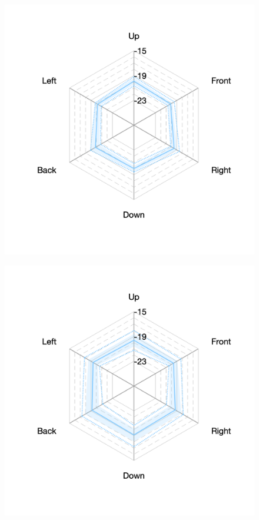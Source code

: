 \documentclass[11pt,a4j]{jreport}
\begin{document}
\begin{figure}[H]
      \begin{minipage}[b]{.33\textwidth}
        \centering
        \includegraphics[width=1\linewidth]{images/realHallDirSt/late_S07_allhall.png}
        \label{fig:S07late}
      \end{minipage}%
      \begin{minipage}[b]{.33\textwidth}
        \centering
        \includegraphics[width=1\linewidth]{images/realHallDirSt/late_S06_allhall.png}

\end{minipage}
\end{figure}
\end{document}
